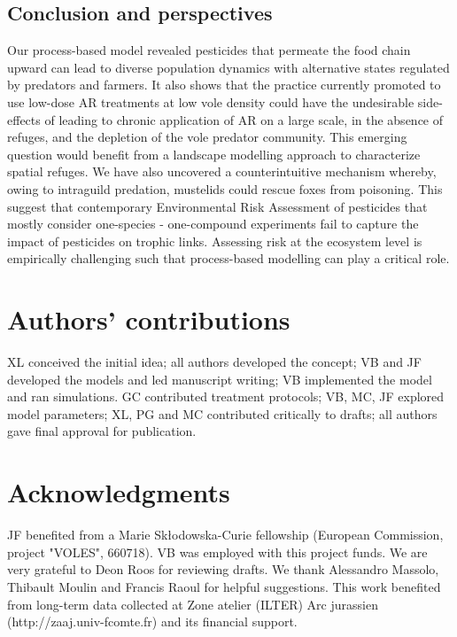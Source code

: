 \documentclass[11pt]{article}
\begin{document}
\subsection{Conclusion and perspectives}

Our process-based model revealed pesticides that permeate the food chain upward can lead to diverse population dynamics with alternative states regulated by predators and farmers. It also shows that the practice currently promoted to use low-dose AR treatments at low vole density could have the undesirable side-effects of leading to chronic application of AR on a large scale, in the absence of refuges, and the depletion of the vole predator community.
%
This emerging question would benefit from a landscape modelling approach to characterize spatial refuges. We have also uncovered a counterintuitive mechanism whereby, owing to intraguild predation, mustelids could rescue foxes from poisoning. This suggest that contemporary Environmental Risk Assessment of pesticides that mostly consider one-species - one-compound experiments fail to capture the impact of pesticides on trophic links.  Assessing risk at the ecosystem level is empirically challenging such that process-based modelling can play a critical role. 

\section*{Authors’ contributions}
	
XL conceived the initial idea; all authors developed the concept; VB and JF developed the models and led manuscript writing; VB implemented the model and ran simulations. GC contributed treatment protocols; VB, MC, JF explored model parameters; XL, PG and MC contributed critically to drafts; all authors gave final approval for publication.


\section*{Acknowledgments}

JF benefited from a Marie Skłodowska-Curie fellowship (European Commission, project "VOLES", 660718). VB was employed with this project funds. We are very grateful to Deon Roos for reviewing drafts. We thank Alessandro Massolo, Thibault Moulin and Francis Raoul for helpful suggestions. This work benefited from long-term data collected at Zone atelier (ILTER) Arc jurassien (http://zaaj.univ-fcomte.fr) and its financial support.
\end{document}
